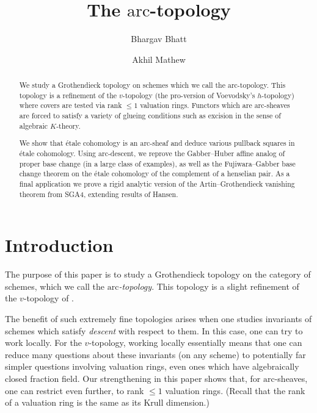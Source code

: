 \documentclass[reqno]{amsart}
\newcommand{\arc}{\mathrm{arc}}
\theoremstyle{definition}
\begin{document}
\title{The $\arc$-topology}
\author{Bhargav Bhatt}
\author{Akhil Mathew}
\maketitle

\begin{abstract}
We study a Grothendieck topology on  schemes
which we call the $\arc$-topology. 
This topology is a 
refinement of the $v$-topology (the pro-version of Voevodsky's $h$-topology)
where 
covers are tested via rank $\leq 1$ valuation rings.
Functors which are $\arc$-sheaves are forced to satisfy a variety of glueing conditions
such as excision in the sense of algebraic $K$-theory. 

We show that \'etale cohomology 
is an $\arc$-sheaf and deduce various pullback squares in \'etale cohomology.  
Using $\arc$-descent, we  reprove
the Gabber--Huber affine analog of proper base change (in
a large class of examples), as well as the Fujiwara--Gabber base change theorem
on the \'etale cohomology of the complement of a henselian pair.
As a final application we prove a rigid analytic version of the
Artin--Grothendieck vanishing
theorem from SGA4, extending results of Hansen. 
\end{abstract}

\tableofcontents


\section{Introduction}



The purpose of this paper is to 
study a Grothendieck topology 
on the category of schemes, which we call the
\emph{$\arc$-topology}. 
This topology is a slight refinement of the $v$-topology of 
\cite{Rydh, BhattScholzeWitt}.  

The benefit of such extremely fine topologies arises when one studies invariants
of schemes which satisfy \emph{descent} with respect to them. In this case, one
can try to work locally. For the $v$-topology, working locally essentially
means that one can reduce many questions about these invariants (on any
scheme) to potentially far simpler questions involving valuation rings, even
ones which have algebraically closed fraction field.
Our strengthening in this paper shows that, for $\arc$-sheaves, one can restrict even further, to rank $\leq
1$ valuation rings. (Recall that the rank of a valuation ring is the same as its Krull dimension.)
\end{document}
